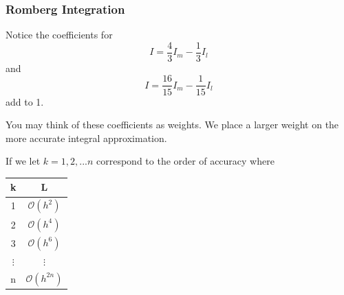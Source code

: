 \documentclass{if-beamer}
\begin{document}
\begin{frame}[t]
	\frametitle{Romberg Integration}
	Notice the coefficients for
	$$ I = \frac{4}{3}I_m -\frac{1}{3}I_l$$
	and
	$$ I = \frac{16}{15}I_m -\frac{1}{15}I_l$$
	add to 1. \\\vspace{10pt}
	
	You may think of these coefficients as weights. We place a larger weight on the more accurate integral approximation. \\\vspace{10pt}
	
	If we let $k = 1,2,...n$ correspond to the order of accuracy where \\
	\begin{minipage}{0.3\textwidth}
		\begin{table}
			\begin{tabular}{c | c }
				k & L\\
				\hline
				1 & $\mathcal{O}(h^2)$ \\
				2 & $\mathcal{O}(h^4)$ \\
				3 & $\mathcal{O}(h^6)$ \\
				$\vdots$ & $\vdots$ \\
				n & $\mathcal{O}(h^{2n})$ \\
			\end{tabular}
		\end{table}
	\end{minipage}
	\begin{minipage}{0.7\textwidth}
			
	\end{minipage}
\end{frame}
\end{document}
